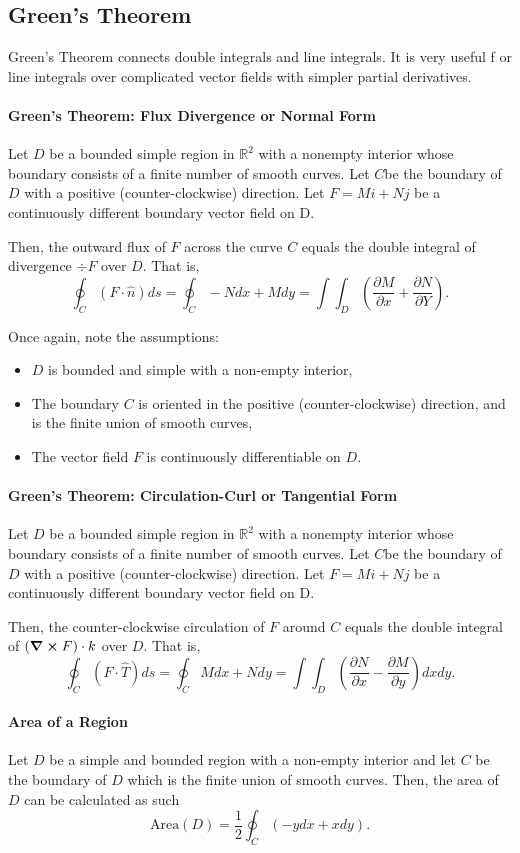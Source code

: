 \subsection{Green's Theorem}
Green's Theorem connects double integrals and line integrals. It is very
useful f or line integrals over complicated vector fields with simpler
partial derivatives.


\paragraph{Green's Theorem: Flux Divergence or Normal Form}
Let \(D\) be a bounded simple region in \(\mathbb{R}^2\) with a nonempty interior
whose boundary consists of a finite number of smooth curves.
Let \(C\)be the boundary of \(D\) with a positive (counter-clockwise) direction.
Let \(F=Mi+Nj\) be a continuously different boundary vector field on D.

Then, the outward flux of \(F\) across the curve \(C\) equals the double
integral of divergence \(\div F\) over \(D\). That is,
\[
    \oint_C (F\cdot \hat{n})ds = \oint_C -Ndx + Mdy
    = \int\int_D  \left(\frac{\partial M}{\partial x} + \frac{\partial N}{\partial Y}\right).
\]

Once again, note the assumptions:
\begin{itemize}
    \item \(D\) is bounded and simple with a non-empty interior,
    \item The boundary \(C\) is oriented in the positive (counter-clockwise) direction,
    and is the finite union of smooth curves,
    \item The vector field \(F\) is continuously differentiable on \(D\).
\end{itemize}

\paragraph{Green's Theorem: Circulation-Curl or Tangential Form}
Let \(D\) be a bounded simple region in \(\mathbb{R}^2\) with a nonempty interior
whose boundary consists of a finite number of smooth curves.
Let \(C\)be the boundary of \(D\) with a positive (counter-clockwise) direction.
Let \(F=Mi+Nj\) be a continuously different boundary vector field on D.

Then, the counter-clockwise circulation of \(F\) around \(C\) equals the double
integral of \((\curl F)\cdot k\) over \(D\).
That is,
\[
    \oint_C (F\cdot \hat{T}) ds =      
    \oint_C Mdx + Ndy = 
    \int\int_D  \left(\frac{\partial N}{\partial x} - \frac{\partial M}{\partial y}\right) dx dy.
\]

\paragraph{Area of a Region}
Let \(D\) be a simple and bounded region with a non-empty interior and let \(C\)
be the boundary of \(D\) which is the finite union of smooth curves.
Then, the area of \(D\) can be calculated as such
\[
\text{Area}(D) = \frac{1}{2} \oint_C \left(-y dx + xdy\right).
\]
